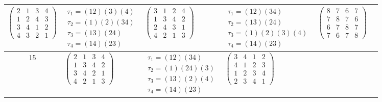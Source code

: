 \begin{longtable}{|c|p{2.7cm}|p{2.7cm}|p{2.7cm}|p{2.7cm}|p{2.7cm}|}
    $\begin{pmatrix} 2 & 1 & 3 & 4 \\ 1 & 2 & 4 & 3 \\ 3 & 4 & 1 & 2 \\ 4 & 3 & 2 & 1 \end{pmatrix}$               &
    $\begin{array}{l}\tau_{1}=(12)(3)(4)\\ \tau_{2}=(1)(2)(34)\\ \tau_{3}=(13)(24)\\ \tau_{4}=(14)(23)\end{array}$ &
    $\begin{pmatrix} 3 & 1 & 2 & 4 \\ 1 & 3 & 4 & 2 \\ 2 & 4 & 3 & 1 \\ 4 & 2 & 1 & 3 \end{pmatrix}$               &
    $\begin{array}{l}\tau_{1}=(12)(34)\\ \tau_{2}=(13)(24)\\ \tau_{3}=(1)(2)(3)(4)\\ \tau_{4}=(14)(23)\end{array}$ &
    $\begin{pmatrix} 8 & 7 & 6 & 7 \\ 7 & 8 & 7 & 6 \\ 6 & 7 & 8 & 7 \\ 7 & 6 & 7 & 8 \end{pmatrix}$                                                                                           \\
    \hline
    15                                                                                                             &
    $\begin{pmatrix} 2 & 1 & 3 & 4 \\ 1 & 3 & 4 & 2 \\ 3 & 4 & 2 & 1 \\ 4 & 2 & 1 & 3 \end{pmatrix}$               &
    $\begin{array}{l}\tau_{1}=(12)(34)\\ \tau_{2}=(1)(24)(3)\\ \tau_{3}=(13)(2)(4)\\ \tau_{4}=(14)(23)\end{array}$ &
    $\begin{pmatrix} 3 & 4 & 1 & 2 \\ 4 & 1 & 2 & 3 \\ 1 & 2 & 3 & 4 \\ 2 & 3 & 4 & 1 \end{pmatrix}$               &

\end{longtable}
